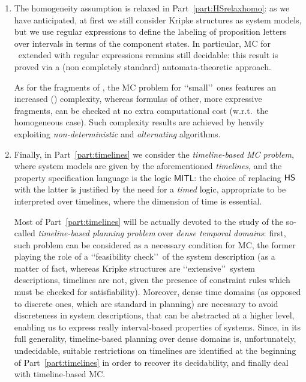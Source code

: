 \begin{enumerate}
\item
The homogeneity assumption is relaxed in Part~\ref{part:HSrelaxhomo}: as we have anticipated, at first we still consider Kripke structures as system models, but we 
use regular expressions to define the labeling of proposition letters over intervals in terms of the component states.
In particular, MC for \HS\ extended with regular expressions remains still decidable: this result is proved via a (non completely standard) automata-theoretic approach.

As for the fragments of \HS, the MC problem for \lq\lq small\rq\rq\ ones features an increased (\Psp) complexity, whereas formulas of other, more expressive fragments, can be checked at no extra computational cost (w.r.t.\ the homogeneous case).
Such complexity results are achieved by heavily exploiting \emph{non-deterministic} and \emph{alternating} algorithms.

\item
Finally, in Part~\ref{part:timelines} we
consider the \emph{timeline-based MC problem},
where system models are given by the aforementioned \emph{timelines},
and the property specification language is the logic $\mathsf{MITL}$: the choice of replacing $\text{\sffamily HS}$ with the latter is justified by the need for a \emph{timed} logic, appropriate to be interpreted over timelines, where the dimension of time is essential. 

Most of Part~\ref{part:timelines} will be actually devoted to the study of the so-called \emph{timeline-based planning problem} over \emph{dense temporal domains}:
first, such problem can be considered as a necessary condition for MC, the former playing the role of a \lq\lq feasibility check\rq\rq\ of the system description (as a matter of fact, whereas Kripke structures are \lq\lq extensive\rq\rq\ system descriptions, timelines are not, given the presence of constraint rules which must be checked for satisfiability). 
Moreover, dense time domains (as opposed to discrete ones, which are standard in planning) are necessary to avoid discreteness in system descriptions, that can be abstracted at a higher level, enabling us to express really interval-based properties of systems.
Since, in its full generality, timeline-based planning over dense domains is, unfortunately, undecidable, suitable restrictions on timelines are identified at the beginning of Part~\ref{part:timelines} in order to recover its decidability, and finally deal with timeline-based MC.

\end{enumerate}
